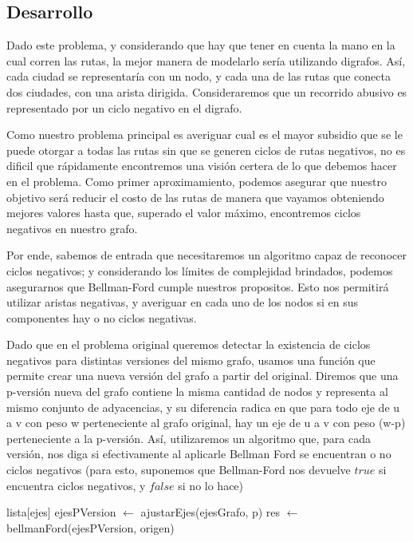 \subsection{Desarrollo}
Dado este problema, y considerando que hay que tener en cuenta la mano en la cual corren las rutas, la mejor manera de modelarlo sería utilizando digrafos. Así, cada ciudad se representaría con un nodo, y cada una de las rutas que conecta dos ciudades, con una arista dirigida. Consideraremos que un recorrido abusivo es representado por un ciclo negativo en el digrafo.
\\
\par
Como nuestro problema principal es averiguar cual es el mayor subsidio que se le puede otorgar a todas las rutas sin que se generen ciclos de rutas negativos, no es dificil que rápidamente encontremos una visión certera de lo que debemos hacer en el problema. Como primer aproximamiento, podemos asegurar que nuestro objetivo será reducir el costo de las rutas de manera que vayamos obteniendo mejores valores hasta que, superado el valor máximo, encontremos ciclos negativos en nuestro grafo.
\\
\par
Por ende, sabemos de entrada que necesitaremos un algoritmo capaz de reconocer ciclos negativos; y considerando los límites de complejidad brindados, podemos asegurarnos que Bellman-Ford cumple nuestros propositos. Esto nos permitirá utilizar aristas negativas, y averiguar en cada uno de los nodos si en sus componentes hay o no ciclos negativas.
\\
\par
Dado que en el problema original queremos detectar la existencia de ciclos negativos para distintas versiones del mismo grafo, usamos una función que permite crear una nueva versión del grafo a partir del original. Diremos que una p-versión nueva del grafo contiene la misma cantidad de nodos y representa al mismo conjunto de adyacencias, y su diferencia radica en que para todo eje de u a v con peso w perteneciente al grafo original, hay un eje de u a v con peso (w-p) perteneciente a la p-versión. Así, utilizaremos un algoritmo que, para cada versión, nos diga si efectivamente al aplicarle Bellman Ford se encuentran o no ciclos negativos (para esto, suponemos que Bellman-Ford nos devuelve $true$ si encuentra ciclos negativos, y $false$ si no lo hace)
\\
\par
\begin{algorithm}[H]
		\NoCaptionOfAlgo
		\caption{}
		
		lista[ejes] ejesPVersion $\leftarrow$ ajustarEjes(ejesGrafo, p)
		res $\leftarrow$ bellmanFord(ejesPVersion, origen)		

	\end{algorithm}

